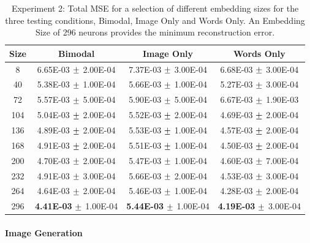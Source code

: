 \begin{table}
\centering
	\begin{tabular}{|c|c|c|c|}
	\hline
	Size & 	Bimodal & 	Image Only 	& 	Words Only \\ \hline
8	&	6.65E-03	$\mypm$	2.00E-04	&	7.37E-03	$\mypm$	3.00E-04	&	6.68E-03	$\mypm$	3.00E-04	\\ \hline
40	&	5.38E-03	$\mypm$	1.00E-04	&	5.66E-03	$\mypm$	1.00E-04	&	5.27E-03	$\mypm$	3.00E-04	\\ \hline
72	&	5.57E-03	$\mypm$	5.00E-04	&	5.90E-03	$\mypm$	5.00E-04	&	6.67E-03	$\mypm$	1.90E-03	\\ \hline
104	&	5.04E-03	$\mypm$	2.00E-04	&	5.52E-03	$\mypm$	2.00E-04	&	4.69E-03	$\mypm$	2.00E-04	\\ \hline
136	&	4.89E-03	$\mypm$	2.00E-04	&	5.53E-03	$\mypm$	1.00E-04	&	4.57E-03	$\mypm$	2.00E-04	\\ \hline
168	&	4.91E-03	$\mypm$	2.00E-04	&	5.51E-03	$\mypm$	1.00E-04	&	4.50E-03	$\mypm$	2.00E-04	\\ \hline
200	&	4.70E-03	$\mypm$	2.00E-04	&	5.47E-03	$\mypm$	1.00E-04	&	4.60E-03	$\mypm$	7.00E-04	\\ \hline
232	&	4.91E-03	$\mypm$	3.00E-04	&	5.66E-03	$\mypm$	2.00E-04	&	4.53E-03	$\mypm$	3.00E-04	\\ \hline
264	&	4.64E-03	$\mypm$	2.00E-04	&	5.46E-03	$\mypm$	1.00E-04	&	4.28E-03	$\mypm$	2.00E-04	\\ \hline
296	&	\textbf{4.41E-03}	$\mypm$	1.00E-04	&	\textbf{5.44E-03}	$\mypm$	1.00E-04	&	\textbf{4.19E-03}	$\mypm$	3.00E-04	\\ \hline



	
	\end{tabular}
\caption{Experiment 2:  Total MSE for a selection of different embedding sizes for the three testing conditions, Bimodal, Image Only and Words Only. An Embedding Size of 296 neurons provides the minimum reconstruction error.}
\label{tab:res333}
\end{table}


\paragraph{Image Generation}

